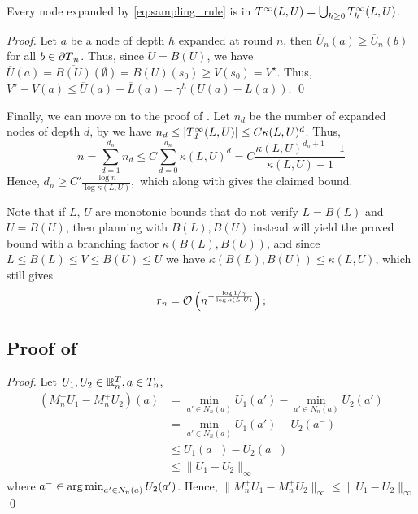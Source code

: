 \documentclass[runningheads]{llncs}
\begin{document}
\begin{lemma}
\label{lemma:expansion-tree}
Every node expanded by \eqref{eq:sampling_rule} is in $T^\infty(L,U) = \bigcup_{h\geq 0} T^\infty_h(L,U)$.
\end{lemma}
\begin{proof}
Let $a$ be a node of depth $h$ expanded at round $n$, then $\overline{U}_n(a) \geq \overline{U}_n(b)$ for all $b\in{\partial T}_n$. Thus, since $U = B(U)$, we have $\overline{U}(a) = \overline{B(U)}(\emptyset) = B(U)(s_0) \geq V(s_0) = V^\star$. Thus, $V^\star - V(a) \leq \overline{U}(a) - \overline{L}(a) = \gamma^h(U(a) - L(a))$.
\qed\end{proof}

Finally, we can move on to the proof of .
Let $n_d$ be the number of expanded nodes of depth $d$, by  we have $n_d \leq |T^\infty_d(L,U)| \leq C\kappa(L,U)^d$. Thus, 
\[n = \sum_{d=1}^{d_n} n_d \leq C\sum_{d=0}^{d_n} \kappa(L,U)^d = C\frac{\kappa(L,U)^{d_n+1}-1}{\kappa(L,U)-1}\]
Hence, $d_n \geq C'\frac{\log n}{\log\kappa(L,U)},$ which along with  gives the claimed bound.

Note that if $L,\,U$ are monotonic bounds that do not verify $L = B(L)$ and $U=B(U)$, then planning with $B(L),B(U)$ instead will yield the proved bound with a branching factor $\kappa(B(L),B(U))$, and since $L\leq B(L)\leq V\leq B(U)\leq U$ we have $\kappa(B(L),B(U)) \leq \kappa(L,U)$, which still gives \begin{align*}
r_n = \mathcal{O}\left(n^{-\frac{\log 1/\gamma}{\log \kappa(L,U)}}\right);
\end{align*}

\subsection{Proof of }
\begin{proof}
Let $U_1, U_2\in \mathbb{R}^T_n, a\in T_n$,
\begin{align*}
    (M_n^+ U_1 - M_n^+ U_2)(a) &= \min_{a'\in N_n(a)} U_1(a') - \min_{a'\in N_n(a)} U_2(a') \\
    &= \min_{a'\in N_n(a)} U_1(a') - U_2(a^-) \\
    &\leq U_1(a^-) - U_2(a^-) \\
    &\leq \|U_1 - U_2\|_\infty
\end{align*}
where $a^-\in \operatorname*{arg\,min}_{a'\in N_n(a)} U_2(a')$. 
Hence, $\|M_n^+ U_1 - M_n^+ U_2\|_\infty \leq \|U_1 - U_2\|_\infty$
\qed\end{proof}
\end{document}

